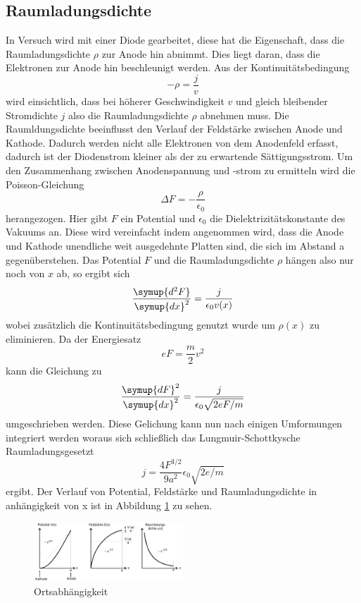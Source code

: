 \subsection{Raumladungsdichte}
In Versuch wird mit einer Diode gearbeitet, diese hat die Eigenschaft, dass die Raumladungsdichte $\rho$ zur Anode hin abnimmt.
Dies liegt daran, dass die Elektronen zur Anode hin beschleunigt werden.
Aus der Kontinuitätsbedingung
\begin{equation*}
    -\rho = \frac{j}{v}
\end{equation*}
wird einsichtlich, dass bei höherer Geschwindigkeit $v$ und gleich bleibender Stromdichte $j$ also die Raumladungsdichte $\rho$ abnehmen muss.
Die Raumldungsdichte beeinflusst den Verlauf der Feldstärke zwischen Anode und Kathode.
Dadurch werden nicht alle Elektronen von dem Anodenfeld erfasst, dadurch ist der Diodenstrom kleiner als der zu erwartende Sättigungsstrom.
Um den Zusammenhang zwischen Anodenspannung und -strom zu ermitteln wird die Poisson-Gleichung
\begin{equation*}
    \Delta F = -\frac{\rho}{\epsilon_0}
\end{equation*}
herangezogen.
Hier gibt $F$ ein Potential und $\epsilon_0$ die Dielektrizitätskonstante des Vakuums an.
Diese wird vereinfacht indem angenommen wird, dass die Anode und Kathode unendliche weit ausgedehnte Platten sind, die sich im Abstand a gegenüberstehen.
Das Potential $F$ und die Raumladungsdichte $\rho$ hängen also nur noch von $x$ ab, so ergibt sich
\begin{equation*}
\frac{\symup{d^2F}}{\symup{dx}^2} = \frac{j}{\epsilon_0 v(x)}
\end{equation*}
wobei zusätzlich die Kontinuitätsbedingung genutzt wurde um $\rho(x)$ zu eliminieren.
Da der Energiesatz
\begin{equation*}
    eF = \frac{m}{2}v^2
\end{equation*}
kann die Gleichung zu 
\begin{equation*}
    \frac{\symup{dF}^2}{\symup{dx}^2} = \frac{j}{\epsilon_0 \sqrt{2eF/m}}
\end{equation*}
umgeschrieben werden.
Diese Gelichung kann nun nach einigen Umformungen integriert werden woraus sich schließlich das Lungmuir-Schottkysche Raumladungsgesetzt
\begin{equation*}
    j = \frac{4F^{3/2}}{9a^2}\epsilon_0 \sqrt{2e/m} 
\end{equation*}
ergibt.
Der Verlauf von Potential, Feldstärke und Raumladungsdichte in anhängigkeit von x ist in Abbildung \ref{fig:ort_raum_feld} zu sehen.
\begin{figure}
    \centering
    \includegraphics[width=0.5\textwidth]{content/data/Verlauf.png}
    \caption{Ortsabhängigkeit}
    \label{fig:ort_raum_feld}
\end{figure}
